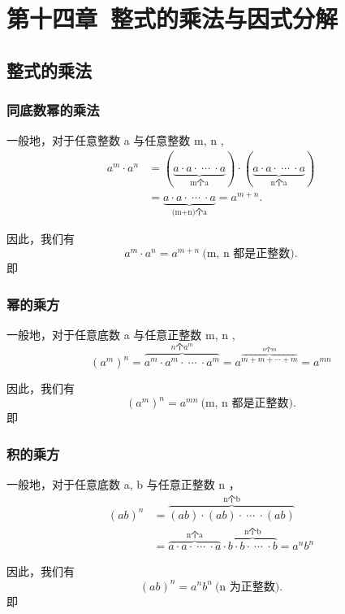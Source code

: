 \documentclass[UTF8,fontset=macnew]{book} %
\begin{document}
	\chapter{第十四章\ 整式的乘法与因式分解}
		\section{整式的乘法}
			\subsection{同底数幂的乘法}
				一般地，对于任意整数 a 与任意整数 m, n , 
				$$\begin{aligned}  a^m \cdot a^n &= (\underbrace{a \cdot a \cdot \  \cdots \  \cdot a}_{\text{m个a}}) \cdot (\underbrace{a\cdot a \cdot \  \cdots \  \cdot a}_{\text{n个a}}) \\ &= \underbrace{a\cdot a\cdot \  \cdots \  \cdot a}_{\text{(m+n)个a}} = a^{m+n}. \end{aligned} $$
				
				因此，我们有
				$$\boxed{a^m\cdot a^n=a^{m+ n}\  \text{(m, n 都是正整数)}.}$$
			即\textcolor[RGB]{4,165,218}{}
			\subsection{幂的乘方}
				一般地，对于任意底数 a 与任意正整数 m, n ,
				 $$(a^m)^n=\overbrace{a^m\cdot a^m\cdot \  \cdots \  \cdot a^m}^{\text{$n$个$a^m$}} =a^{\overbrace{m+m+\cdots +m}^{\text{$n$个$m$}}}= a^{mn} $$
			
				因此，我们有
				$$\boxed{(a^m)^n=a^{mn}\  \text{(m, n 都是正整数)}.}$$
			即\textcolor[RGB]{4,165,218}{}
			\subsection{积的乘方}
				一般地，对于任意底数 a, b 与任意正整数 n ，
				$$\begin{aligned}   (ab)^n &= \overbrace{(ab)\cdot (ab)\cdot \  \cdots \  \cdot (ab)}^{\text{n个b} } \\&= \overbrace{a \cdot a\cdot \  \cdots \  \cdot a}^{\text{n个a}} \cdot \overbrace{b\cdot b\cdot \  \cdots \  \cdot b}^{\text{n个b} }=a^nb^n  \end{aligned}$$
				
				因此，我们有
				$$\boxed{(ab)^n=a^nb^n\  \text{(n 为正整数)}. } $$
			即\textcolor[RGB]{4,165,218}{}
\end{document}
